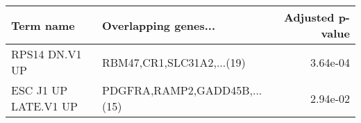 \begin{tabular}{llr}
\toprule
           Term name &         Overlapping genes... &  Adjusted p-value \\
\midrule
      RPS14 DN.V1 UP &    RBM47,CR1,SLC31A2,...(19) &          3.64e-04 \\
ESC J1 UP LATE.V1 UP & PDGFRA,RAMP2,GADD45B,...(15) &          2.94e-02 \\
\bottomrule
\end{tabular}
